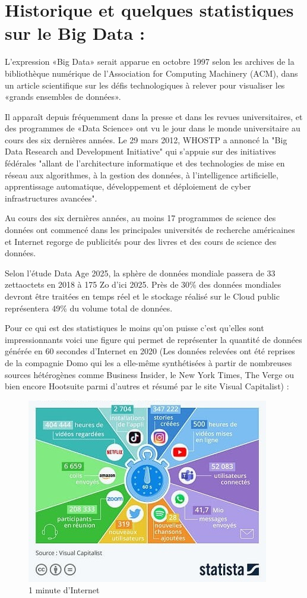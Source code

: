 \section{Historique et quelques statistiques sur le Big Data : }
L'expression «Big Data» serait apparue en octobre 1997 selon les archives de la bibliothèque numérique de l'Association for Computing Machinery (ACM), dans un article scientifique sur les défis technologiques à relever pour visualiser les «grands ensembles de données».

Il apparaît depuis fréquemment dans la presse et dans les revues universitaires, et des programmes de «Data Science» ont vu le jour dans le monde universitaire au cours des six dernières années. Le 29 mars 2012, WHOSTP a annoncé la "Big Data Research and Development Initiative" qui s'appuie sur des initiatives fédérales "allant de l'architecture informatique et des technologies de mise en réseau aux algorithmes, à la gestion des données, à l'intelligence artificielle, apprentissage automatique, développement et déploiement de cyber infrastructures avancées".

Au cours des six dernières années, au moins 17 programmes de science des données ont commencé dans les principales universités de recherche américaines et Internet regorge de publicités pour des livres et des cours de science des données. 

Selon l'étude Data Age 2025, la sphère de données mondiale passera de 33 zettaoctets en 2018 à 175 Zo d'ici 2025. Près de 30\% des données mondiales devront être traitées en temps réel et le stockage réalisé sur le Cloud public représentera 49\% du volume total de données.

Pour ce qui est des statistiques le moins qu’on puisse c’est qu’elles sont impressionnants voici une figure qui permet de représenter la quantité de données générée en 60 secondes d'Internet en 2020 (Les données relevées ont été reprises de la compagnie Domo qui les a elle-même synthétisées à partir de nombreuses sources hétérogènes comme Business Insider, le New York Times, The Verge ou bien encore Hootsuite parmi d'autres et résumé par le site Visual Capitalist) :

\begin{figure}[h]
 \centering
 \includegraphics[scale=0.8]{img/fig1_}
 \caption{1 minute d'Internet}
\end{figure}

